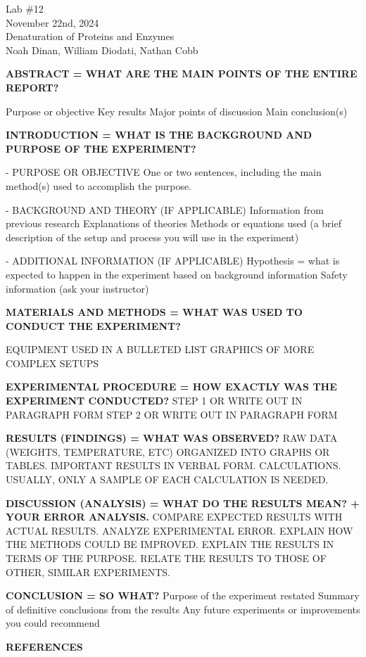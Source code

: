 \documentclass[12pt]{article}
\begin{document}
\begin{center}
\vspace*{\fill}
Lab \#12\\
November 22nd, 2024\\
Denaturation of Proteins and Enzymes\\
Noah Dinan, William Diodati, Nathan Cobb\\
\vspace*{\fill}
\end{center}

\newpage

\setlength{\parindent}{0in}

\textbf{ABSTRACT = WHAT ARE THE MAIN POINTS OF THE ENTIRE REPORT?}

Purpose or objective
Key results
Major points of discussion
Main conclusion(s)

\textbf{INTRODUCTION = WHAT IS THE BACKGROUND AND PURPOSE OF THE EXPERIMENT?}

- PURPOSE OR OBJECTIVE
One or two sentences, including the main method(s) used to accomplish the purpose.

- BACKGROUND AND THEORY (IF APPLICABLE)
Information from previous research
Explanations of theories
Methods or equations used (a brief description of the setup and process you will use in the experiment)

- ADDITIONAL INFORMATION (IF APPLICABLE)
Hypothesis = what is expected to happen in the experiment based on background information
Safety information (ask your instructor)

\textbf{MATERIALS AND METHODS = WHAT WAS USED TO CONDUCT THE EXPERIMENT?}

EQUIPMENT USED IN A BULLETED LIST
GRAPHICS OF MORE COMPLEX SETUPS

\textbf{EXPERIMENTAL PROCEDURE = HOW EXACTLY WAS THE EXPERIMENT CONDUCTED?}
STEP 1 OR WRITE OUT IN PARAGRAPH FORM
STEP 2 OR WRITE OUT IN PARAGRAPH FORM

\textbf{RESULTS (FINDINGS) = WHAT WAS OBSERVED?}
RAW DATA (WEIGHTS, TEMPERATURE, ETC) ORGANIZED INTO GRAPHS OR TABLES.
IMPORTANT RESULTS IN VERBAL FORM.
CALCULATIONS. USUALLY, ONLY A SAMPLE OF EACH CALCULATION IS NEEDED.

\textbf{DISCUSSION (ANALYSIS) = WHAT DO THE RESULTS MEAN? + YOUR ERROR ANALYSIS.}
COMPARE EXPECTED RESULTS WITH ACTUAL RESULTS.
ANALYZE EXPERIMENTAL ERROR.
EXPLAIN HOW THE METHODS COULD BE IMPROVED.
EXPLAIN THE RESULTS IN TERMS OF THE PURPOSE.
RELATE THE RESULTS TO THOSE OF OTHER, SIMILAR EXPERIMENTS.

\textbf{CONCLUSION = SO WHAT?}
Purpose of the experiment restated
Summary of definitive conclusions from the results
Any future experiments or improvements you could recommend

\textbf{REFERENCES}
\end{document}
